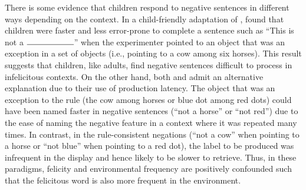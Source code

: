\documentclass[man, noapacite]{apa2}
\begin{document}
There is some evidence that children respond to negative sentences in different ways depending on the context.  In a child-friendly adaptation of ,  found that children were faster and less error-prone to complete a sentence such as ``This is not a $\rule{2cm}{0.15mm}$'' when the experimenter pointed to an object that was an exception in a set of objects (i.e., pointing to a cow among six horses). This result suggests that children, like adults, find negative sentences difficult to process in infelicitous contexts. On the other hand, both  and  admit an alternative explanation due to their use of production latency. The object that was an exception to the rule (the cow among horses or blue dot among red dots) could have been named faster in negative sentences (``not a horse'' or ``not red'') due to the ease of naming the negative feature in a context where it was repeated many times. In contrast, in the rule-consistent negations (``not a cow'' when pointing to a horse or ``not blue'' when pointing to a red dot), the label to be produced was infrequent in the display and hence likely to be slower to retrieve. Thus, in these paradigms, felicity and environmental frequency are positively confounded such that the felicitous word is also more frequent in the environment.
\end{document}
